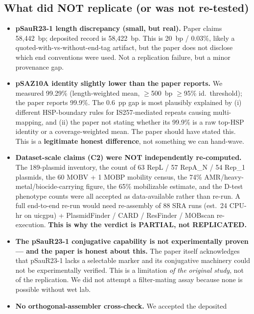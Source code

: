 \documentclass[11pt]{article}
\begin{document}
\subsection*{What did NOT replicate (or was not re-tested)}
\begin{itemize}
  \item \textbf{pSauR23-1 length discrepancy (small, but real).} Paper claims
        58{,}442~bp; deposited record is 58{,}422~bp. This is 20~bp / 0.03\%,
        likely a quoted-with-vs-without-end-tag artifact, but the paper does
        not disclose which end conventions were used. Not a replication
        failure, but a minor provenance gap.
  \item \textbf{pSAZ10A identity slightly lower than the paper reports.}
        We measured 99.29\% (length-weighted mean, $\geq$500~bp $\geq$95\% id.\
        threshold); the paper reports 99.9\%. The 0.6~pp gap is most plausibly
        explained by (i) different HSP-boundary rules for IS257-mediated
        repeats causing multi-mapping, and (ii) the paper not stating whether
        its 99.9\% is a raw top-HSP identity or a coverage-weighted mean. The
        paper should have stated this. This is a \textbf{legitimate honest
        difference}, not something we can hand-wave.
  \item \textbf{Dataset-scale claims (C2) were NOT independently re-computed.}
        The 189-plasmid inventory, the count of 63 RepL / 57 RepA\_N / 54
        Rep\_1 plasmids, the 60 MOBV + 1 MOBP mobility census, the 74\%
        AMR/heavy-metal/biocide-carrying figure, the 65\% mobilizable estimate,
        and the D-test phenotype counts were all accepted as data-available
        rather than re-run. A full end-to-end re-run would need re-assembly of
        88 SRA runs (est.\ 24 CPU-hr on uicgpu) + PlasmidFinder / CARD /
        ResFinder / MOBscan re-execution. \textbf{This is why the verdict is
        PARTIAL, not REPLICATED.}
  \item \textbf{The pSauR23-1 conjugative capability is not experimentally
        proven --- and the paper is honest about this.} The paper itself
        acknowledges that pSauR23-1 lacks a selectable marker and its
        conjugative machinery could not be experimentally verified. This is
        a limitation \textit{of the original study}, not of the replication.
        We did not attempt a filter-mating assay because none is possible
        without wet lab.
  \item \textbf{No orthogonal-assembler cross-check.} We accepted the deposited

\end{itemize}
\end{document}
